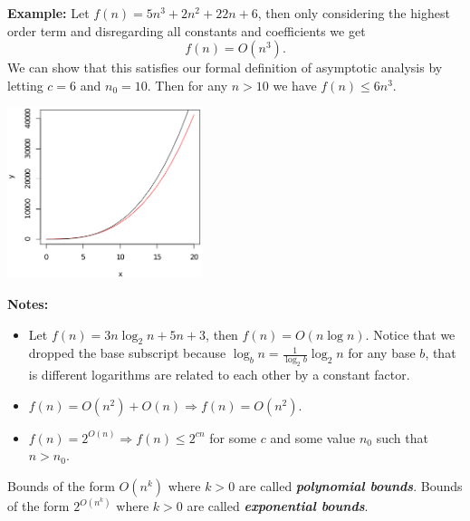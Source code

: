 \documentclass[a4paper,blends,pdf,colorBG,slideColor]{prosper}
\begin{document}
\small
{\bf Example:} Let $f(n) = 5n^3 + 2n^2 + 22n + 6$, then only considering the highest order
term and disregarding all constants and coefficients we get
\[
f(n) = O(n^3).
\]
We can show that this satisfies our formal definition of asymptotic analysis by letting $c = 6$
and $n_0 = 10$.  Then for any $n > 10$ we have $f(n) \le 6 n^3$.
\begin{center}
\includegraphics[height=50mm]{images/n3-complexity.eps}
\end{center}
\es

{\bf Notes:}
\begin{itemize}
\item Let $f(n) = 3 n \log_2 n + 5n + 3$, then $f(n) = O(n\log n)$.  Notice that we dropped
the base subscript because $\log_b n = \frac{1}{\log_2 b}\log_2 n$ for any base $b$, that is
different logarithms are related to each other by a constant factor.
\item $f(n) = O(n^2) + O(n) \Rightarrow f(n) = O(n^2)$.
\item $f(n) = 2^{O(n)} \Rightarrow f(n) \le 2^{c n}$ for some $c$ and some value $n_0$ such
that $n > n_0$.
\end{itemize}

Bounds of the form $O(n^k)$ where $k > 0$ are called {\bf\em polynomial bounds}.
Bounds of the form $2^{O(n^k)}$ where $k > 0$ are called {\bf\em exponential bounds}.
\es
\end{document}
